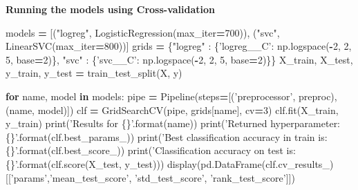 \documentclass[10pt,a4paper]{article}
\newenvironment{Shaded}{\begin{snugshade}}{\end{snugshade}}
\newcommand{\BuiltInTok}[1]{#1}
\newcommand{\ControlFlowTok}[1]{\textcolor[rgb]{0.13,0.29,0.53}{\textbf{#1}}}
\newcommand{\DecValTok}[1]{\textcolor[rgb]{0.00,0.00,0.81}{#1}}
\newcommand{\KeywordTok}[1]{\textcolor[rgb]{0.13,0.29,0.53}{\textbf{#1}}}
\newcommand{\NormalTok}[1]{#1}
\newcommand{\OperatorTok}[1]{\textcolor[rgb]{0.81,0.36,0.00}{\textbf{#1}}}
\newcommand{\SpecialCharTok}[1]{\textcolor[rgb]{0.00,0.00,0.00}{#1}}
\newcommand{\StringTok}[1]{\textcolor[rgb]{0.31,0.60,0.02}{#1}}
\theoremstyle{break}
\begin{document}
\textbf{Running the models using Cross-validation}

\begin{Shaded}
\begin{Highlighting}[]
\NormalTok{models }\OperatorTok{=}\NormalTok{ [(}\StringTok{"logreg"}\NormalTok{, LogisticRegression(max_iter}\OperatorTok{=}\DecValTok{700}\NormalTok{)),}
\NormalTok{          (}\StringTok{"svc"}\NormalTok{, LinearSVC(max_iter}\OperatorTok{=}\DecValTok{800}\NormalTok{))]}
\NormalTok{grids }\OperatorTok{=}\NormalTok{ \{}\StringTok{"logreg"}\NormalTok{ : \{}\StringTok{'logreg__C'}\NormalTok{: np.logspace(}\OperatorTok{-}\DecValTok{2}\NormalTok{, }\DecValTok{2}\NormalTok{, }\DecValTok{5}\NormalTok{, base}\OperatorTok{=}\DecValTok{2}\NormalTok{)\},}
         \StringTok{"svc"}\NormalTok{ : \{}\StringTok{'svc__C'}\NormalTok{: np.logspace(}\OperatorTok{-}\DecValTok{2}\NormalTok{, }\DecValTok{2}\NormalTok{, }\DecValTok{5}\NormalTok{, base}\OperatorTok{=}\DecValTok{2}\NormalTok{)\}\}}
\NormalTok{X_train, X_test, y_train, y_test }\OperatorTok{=}\NormalTok{ train_test_split(X, y)}

\ControlFlowTok{for}\NormalTok{ name, model }\KeywordTok{in}\NormalTok{ models:}
\NormalTok{    pipe }\OperatorTok{=}\NormalTok{ Pipeline(steps}\OperatorTok{=}\NormalTok{[(}\StringTok{'preprocessor'}\NormalTok{, preproc), (name, model)])}
\NormalTok{    clf }\OperatorTok{=}\NormalTok{ GridSearchCV(pipe, grids[name], cv}\OperatorTok{=}\DecValTok{3}\NormalTok{)}
\NormalTok{    clf.fit(X_train, y_train)}
    \BuiltInTok{print}\NormalTok{(}\StringTok{'Results for }\SpecialCharTok{\{\}}\StringTok{'}\NormalTok{.}\BuiltInTok{format}\NormalTok{(name))}
    \BuiltInTok{print}\NormalTok{(}\StringTok{'Returned hyperparameter: }\SpecialCharTok{\{\}}\StringTok{'}\NormalTok{.}\BuiltInTok{format}\NormalTok{(clf.best_params_))}
    \BuiltInTok{print}\NormalTok{(}\StringTok{'Best classification accuracy in train is: }\SpecialCharTok{\{\}}\StringTok{'}\NormalTok{.}\BuiltInTok{format}\NormalTok{(clf.best_score_))}
    \BuiltInTok{print}\NormalTok{(}\StringTok{'Classification accuracy on test is: }\SpecialCharTok{\{\}}\StringTok{'}\NormalTok{.}\BuiltInTok{format}\NormalTok{(clf.score(X_test, y_test)))    }
\NormalTok{    display(pd.DataFrame(clf.cv_results_)[[}\StringTok{'params'}\NormalTok{,}\StringTok{'mean_test_score'}\NormalTok{, }\StringTok{'std_test_score'}\NormalTok{,}
                                           \StringTok{'rank_test_score'}\NormalTok{]])}
\end{Highlighting}
\end{Shaded}
\end{document}
